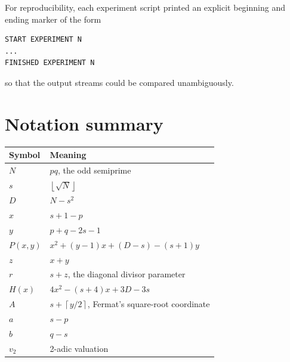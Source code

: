 \documentclass[11pt,a4paper]{article}
\newcommand{\floor}[1]{\left\lfloor #1 \right\rfloor}
\newcommand{\ceil}[1]{\left\lceil #1 \right\rceil}
\begin{document}
For reproducibility, each experiment script printed an explicit beginning and ending marker of the form
\begin{lstlisting}
START EXPERIMENT N
...
FINISHED EXPERIMENT N
\end{lstlisting}
so that the output streams could be compared unambiguously.

\section{Notation summary}
\begin{longtable}{p{} p{}}
\toprule
Symbol & Meaning\\
\midrule
$N$ & $pq$, the odd semiprime\\
$s$ & $\floor{\sqrt N}$\\
$D$ & $N-s^2$\\
$x$ & $s+1-p$\\
$y$ & $p+q-2s-1$\\
$P(x,y)$ & $x^2+(y-1)x+(D-s)-(s+1)y$\\
$z$ & $x+y$\\
$r$ & $s+z$, the diagonal divisor parameter\\
$H(x)$ & $4x^2-(s+4)x+3D-3s$\\
$A$ & $s+\ceil{y/2}$, Fermat's square-root coordinate\\
$a$ & $s-p$\\
$b$ & $q-s$\\
$v_2$ & 2-adic valuation\\
\bottomrule
\end{longtable}
\end{document}
